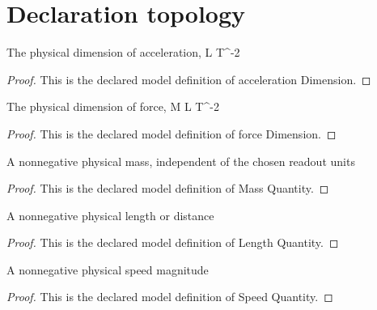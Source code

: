 \section{Declaration topology}
\begin{definition}
  \label{def:physics:phyx-mini-0812:phyxminiproblems-problemphyxmini0812-accelerationdimension}
  The physical dimension of acceleration, L T\textasciicircum{}-2
\end{definition}
\begin{proof}
  This is the declared model definition of acceleration Dimension.
\end{proof}
\begin{definition}
  \label{def:physics:phyx-mini-0812:phyxminiproblems-problemphyxmini0812-forcedimension}
  The physical dimension of force, M L T\textasciicircum{}-2
\end{definition}
\begin{proof}
  This is the declared model definition of force Dimension.
\end{proof}
\begin{definition}
  \label{def:physics:phyx-mini-0812:phyxminiproblems-problemphyxmini0812-massquantity}
  A nonnegative physical mass, independent of the chosen readout units
\end{definition}
\begin{proof}
  This is the declared model definition of Mass Quantity.
\end{proof}
\begin{definition}
  \label{def:physics:phyx-mini-0812:phyxminiproblems-problemphyxmini0812-lengthquantity}
  A nonnegative physical length or distance
\end{definition}
\begin{proof}
  This is the declared model definition of Length Quantity.
\end{proof}
\begin{definition}
  \label{def:physics:phyx-mini-0812:phyxminiproblems-problemphyxmini0812-speedquantity}
  A nonnegative physical speed magnitude
\end{definition}
\begin{proof}
  This is the declared model definition of Speed Quantity.
\end{proof}
